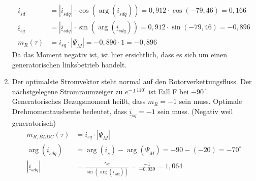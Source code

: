 \begin{solution}
\begin{enumerate}
\begin{align}
			\underline{i}_{sd} & = |\underline{i}_{sdq}| \cdot \cos(\arg(\underline{i}_{sdq})) = 0,912 \cdot \cos(-79,46) = 0,166 \\
			\underline{i}_{sq} & = |\underline{i}_{sdq}| \cdot \sin(\arg(\underline{i}_{sdq})) = 0,912 \cdot \sin(-79,46) = -0,896 \\
			m_R(\tau)& =  i_{sq} \cdot | \underline{\Psi}_M|= -0,896 \cdot 1 = -0,896
		\end{align}
		Da das Moment negativ ist, ist hier ersichtlich, dass es sich um einen generatorischen linksbetrieb handelt.
		\begin{figure}[H]
			\label{fig:20160615lsg12}
		\end{figure}
		\item Der optimalste Stromvektor steht normal auf den Rotorverkettungsfluss. Der nächstgelegene Stromraumzeiger zu $e^{-\jmath 110 ^\circ}$ ist Fall F bei $-90 ^\circ$. Generatorisches Bezugsmoment heißt, dass $m_R=-1$ sein muss. Optimale Drehmomentausbeute bedeutet, dass $\underline{i}_{sq} = -1$ sein muss. (Negativ weil generatorisch)
		\begin{align}
			m_{R,BLDC}(\tau)& =  i_{sq} \cdot | \underline{\Psi}_M|\\
			\arg(\underline{i}_{sdq}) &= \arg(\underline{i}_s) - \arg(\underline{\Psi}_M) = -90 - (-20) = -70^\circ \\
			|\underline{i}_{sdq}| &= \frac{i_{sq}}{\sin(\arg(\underline{i}_{sdq}))}= \frac{-1}{-0,939}=1,064 \\

\end{align}
\end{enumerate}
\end{solution}
